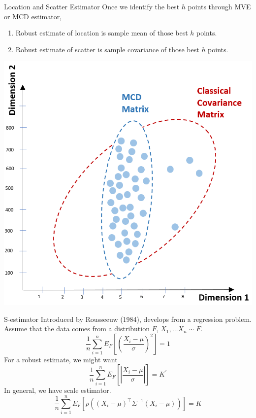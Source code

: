 \documentclass[10pt,xcolor=svgnames]{beamer} %
\newcommand{\tr}{^{\intercal}}
\begin{document}
\begin{frame}{Location and Scatter Estimator}
    Once we identify the best $h$ points through MVE or MCD estimator,
    \begin{minipage}{0.5\textwidth}
        \begin{enumerate}
            \item Robust estimate of location is sample mean of those best $h$ points.
            \item Robust estimate of scatter is sample covariance of those best $h$ points.
        \end{enumerate}
    \end{minipage}
    \hfill
    \begin{minipage}{0.48\textwidth}
        \includegraphics[width = \textwidth]{images/compare.png}
    \end{minipage}
\end{frame}



\begin{frame}{S-estimator}
    Introduced by Rousseeuw (1984), develops from a regression problem.\\
    Assume that the data comes from a distribution $F$, $X_1, \dots X_n \sim F$.
    \begin{equation*}
        \dfrac{1}{n}\sum_{i=1}^n E_F\left[ \left( \dfrac{X_i - \mu}{\sigma} \right)^2 \right] = 1
    \end{equation*}
    For a robust estimate, we might want
    \begin{equation*}
        \dfrac{1}{n}\sum_{i=1}^n E_F\left[ \left\vert \dfrac{X_i - \mu}{\sigma} \right\vert \right] = K^\prime
    \end{equation*}
    In general, we have scale estimator.
    \begin{equation*}
        \dfrac{1}{n}\sum_{i=1}^n E_F\left[ \rho\left( (X_i - \mu)\tr \Sigma^{-1} (X_i - \mu ) \right) \right] = K
    \end{equation*}
\end{frame}
\end{document}
